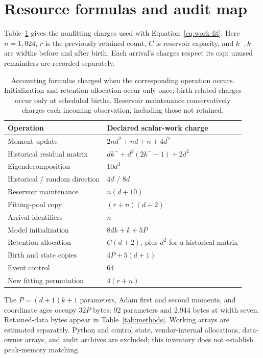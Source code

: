 \documentclass[10pt]{article}
\begin{document}



\appendix
\section{Resource formulas and audit map}
\label{sec:repro}

Table~\ref{tab:costs} gives the nonfitting charges used with
Equation~\eqref{eq:work-fit}. Here $n=1{,}024$, $r$ is the previously
retained count, $C$ is reservoir capacity, and $k^-,k$ are widths
before and after birth. Each arrival's charges respect its cap;
unused remainders are recorded separately.

\begin{table}[ht]
\centering\small
\begin{tabularx}{\linewidth}{lX}
\toprule
Operation & Declared scalar-work charge\\
\midrule
Moment update & $2nd^2+nd+n+4d^2$\\
Historical residual matrix & $dk^-+d^2(2k^- -1)+2d^2$\\
Eigendecomposition & $10d^3$\\
Historical / random direction & $4d$ / $8d$\\
Reservoir maintenance & $n(d+10)$\\
Fitting-pool copy & $(r+n)(d+2)$\\
Arrival identifiers & $n$\\
Model initialization & $8dk+k+5P$\\
Retention allocation & $C(d+2)$, plus $d^2$ for a historical matrix\\
Birth and state copies & $4P+5(d+1)$\\
Event control & 64\\
New fitting permutation & $4(r+n)$\\
\bottomrule
\end{tabularx}
\caption{Accounting formulas charged when the corresponding operation
occurs. Initialization and retention allocation occur only once;
birth-related charges occur only at scheduled births. Reservoir
maintenance conservatively charges each incoming observation,
including those not retained.}
\label{tab:costs}
\end{table}

The $P=(d+1)k+1$ parameters, Adam first and second moments, and
coordinate ages occupy $32P$ bytes: 92 parameters and 2,944 bytes
at width seven. Retained-data bytes appear in Table~\ref{tab:methods}.
Working arrays are estimated separately. Python and control state,
vendor-internal allocations, data-owner arrays, and audit archives
are excluded; this inventory does not establish peak-memory matching.
\end{document}

